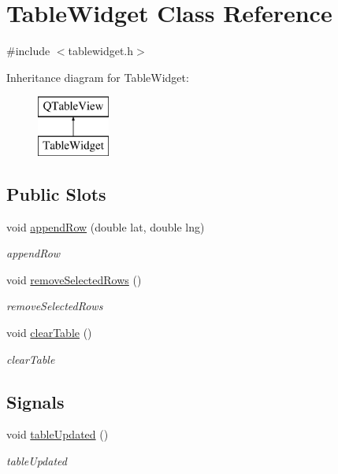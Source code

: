 \hypertarget{class_table_widget}{}\section{Table\+Widget Class Reference}
\label{class_table_widget}


{\ttfamily \#include $<$tablewidget.\+h$>$}

Inheritance diagram for Table\+Widget\+:\begin{figure}[H]
\begin{center}
\leavevmode
\includegraphics[height=2.000000cm]{class_table_widget}
\end{center}
\end{figure}
\subsection*{Public Slots}
\begin{DoxyCompactItemize}
\item 
void \hyperlink{class_table_widget_afa9b2a89c72a5895134c8f45f39ff514}{append\+Row} (double lat, double lng)
\begin{DoxyCompactList}\small\item\em append\+Row \end{DoxyCompactList}\item 
void \hyperlink{class_table_widget_aa1751d4d1f9d82e4a959260e24a650d3}{remove\+Selected\+Rows} ()
\begin{DoxyCompactList}\small\item\em remove\+Selected\+Rows \end{DoxyCompactList}\item 
void \hyperlink{class_table_widget_a159b1f8816eaa41ff2a4844a8a9f0f55}{clear\+Table} ()
\begin{DoxyCompactList}\small\item\em clear\+Table \end{DoxyCompactList}\end{DoxyCompactItemize}
\subsection*{Signals}
\begin{DoxyCompactItemize}
\item 
void \hyperlink{class_table_widget_aa53e286c6cea8cb627543b6db289b8cf}{table\+Updated} ()
\begin{DoxyCompactList}\small\item\em table\+Updated \end{DoxyCompactList}\end{DoxyCompactItemize}
